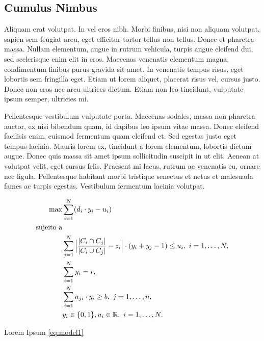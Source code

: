 \documentclass{sciposter}
\begin{document}
\begin{multicols}{3}
\section{Cumulus Nimbus}

Aliquam erat volutpat. In vel eros nibh. Morbi finibus, nisi non aliquam volutpat, sapien sem feugiat arcu, eget efficitur tortor tellus non tellus. Donec et pharetra massa. Nullam elementum, augue in rutrum vehicula, turpis augue eleifend dui, sed scelerisque enim elit in eros. Maecenas venenatis elementum magna, condimentum finibus purus gravida sit amet. In venenatis tempus risus, eget lobortis sem fringilla eget. Etiam ut lorem aliquet, placerat risus vel, cursus justo. Donec non eros nec arcu ultrices dictum. Etiam non leo tincidunt, vulputate ipsum semper, ultricies mi.

Pellentesque vestibulum vulputate porta. Maecenas sodales, massa non pharetra auctor, ex nisi bibendum quam, id dapibus leo ipsum vitae massa. Donec eleifend facilisis enim, euismod fermentum quam eleifend et. Sed egestas justo eget tempus lacinia. Mauris lorem ex, tincidunt a lorem elementum, lobortis dictum augue. Donec quis massa sit amet ipsum sollicitudin suscipit in ut elit. Aenean at volutpat velit, eget cursus felis. Praesent mi lacus, rutrum ac venenatis eu, ornare nec ligula. Pellentesque habitant morbi tristique senectus et netus et malesuada fames ac turpis egestas. Vestibulum fermentum lacinia volutpat.

\begin{subequations}\allowdisplaybreaks
  \label{eq:model1}
  \begin{align}
    \max & \sum\limits_{i = 1}^N (d_i \cdot y_i - u_i) \label{eq:ocm1:of}\\
    \text{sujeito a} & \nonumber \\
    & \sum\limits_{j = 1}^N \Big|\frac{|C_i \cap C_j|}{|C_i \cup C_j|} -
      z_i\Big| \cdot (y_i + y_j - 1) \leq u_i, \ i = 1, \dots, N,
      \label{eq:ocm1:cons1} \\
    & \sum\limits_{i = 1}^N y_i = r, \label{eq:ocm1:cons2} \\
    & \sum\limits_{i = 1}^N a_{ji} \cdot y_i \geq b, \ j = 1, \dots,
      n, \label{eq:ocm1:cons3} \\
    & y_i \in \{0, 1\}, u_i \in \mathbb{R}, \ i = 1, \dots, N.
      \label{eq:ocm1:cons4}
  \end{align}
\end{subequations}

    Lorem Ipsum \ref{eq:model1}


\end{multicols}
\end{document}
